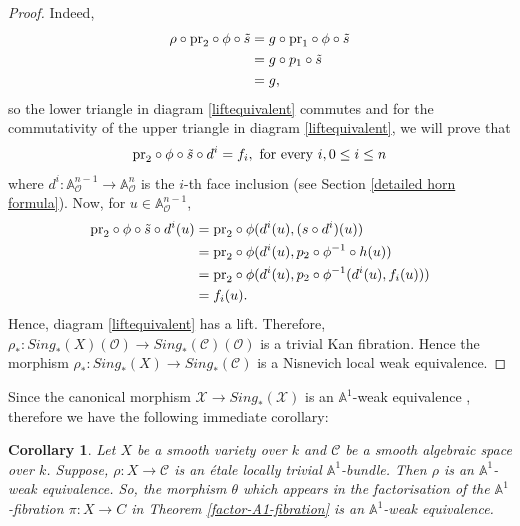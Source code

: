 \documentclass[11pt, reqno]{amsart}
\theoremstyle{plain}
\newtheorem{corollary}[thm]{Corollary}
\theoremstyle{definition}
\newcommand{\sO}{{\mathcal O}}
\newcommand{\A}{{\mathbb A}}
\begin{document}
\begin{proof}
		Indeed,
		\begin{align*}
			\rho \circ \text{pr}_2 \circ \phi \circ \Tilde{s} &= g \circ \text{pr}_1 \circ \phi \circ \Tilde{s} \\
			& = g \circ p_1 \circ \Tilde{s} \\
			& = g,
		\end{align*}
so the lower triangle in diagram \ref{liftequivalent} commutes and for the commutativity of the upper triangle in diagram \ref{liftequivalent}, we will prove that 
$$\text{pr}_2 \circ \phi \circ \Tilde{s} \circ d^i = f_i, \text{ for every }i, 0 \leq i \leq n$$
where $d^i: \A^{n-1}_\sO \to \A^n_\sO$ is the $i$-th face inclusion (see Section \ref{detailed horn formula}).
Now, for $u \in  \mathbb{A}^{n-1}_{\mathcal{O}}$,
		\begin{align*}
			\text{pr}_2 \circ \phi \circ \Tilde{s} \circ d^i (u) &=  \text{pr}_2 \circ \phi(d^i(u),(s\circ d^i)(u))\\
			&=\text{pr}_2 \circ \phi(d^i(u), p_2\circ \phi^{-1} \circ h(u))\\
			&=\text{pr}_2 \circ \phi(d^i(u), p_2\circ \phi^{-1}(d^i(u),f_i(u))) \\
			&=f_i(u).
		\end{align*}
Hence, diagram \ref{liftequivalent} has a lift.
		Therefore, 
$\rho_*: Sing_*(X)(\mathcal{O}) \to Sing_*(\mathcal{C})(\mathcal{O})$ is a trivial Kan fibration. Hence the morphism $\rho_*: Sing_*(X) \to Sing_*(\mathcal{C})$ is a Nisnevich local weak equivalence.
		
	\end{proof}
    Since the canonical morphism $\mathcal{X} \to Sing_*(\mathcal{X})$ is an $\mathbb{A}^1$-weak equivalence \cite[Corollary 3.8, Section 2.3]{mv}, therefore we have the following immediate corollary:
	\begin{corollary} \label{factorisation A1 equivalence}
	    Let $X$ be a smooth variety over $k$ and $\mathcal{C}$ be a smooth algebraic space over $k$. Suppose, $\rho: X \to \mathcal{C}$ is an \'etale locally trivial $\mathbb{A}^1$-bundle. Then $\rho$ is an $\mathbb{A}^1$-weak equivalence. So, the morphism $\theta$ which appears in the factorisation of the $\A^1$-fibration $\pi:X \to C$ in Theorem \ref{factor-A1-fibration} is an $\A^1$-weak equivalence.
	\end{corollary}
\end{document}
